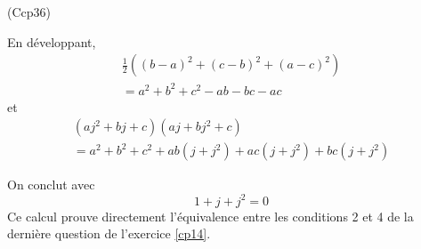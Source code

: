 \begin{tiny}(Ccp36)\end{tiny} En développant,
\begin{multline*}
  \frac{1}{2}\left( (b-a)^2+(c-b)^2+(a-c)^2\right)\\
  = a^2+b^2+c^2 -ab-bc-ac
\end{multline*} et
\begin{multline*}
  (aj^2+bj+c)(aj+bj^2+c)\\=
  a^2+b^2+c^2+ab(j+j^2)+ac(j+j^2)+bc(j+j^2)
\end{multline*}

On conclut avec
\begin{displaymath}
  1+j+j^2 = 0
\end{displaymath}
Ce calcul prouve directement l'équivalence entre les conditions 2 et 4 de la dernière question de l'exercice \ref{cp14}.
